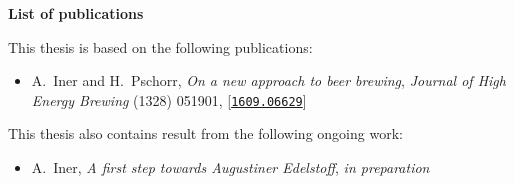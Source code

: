%
%
%
%


\pagestyle{empty}
\begin{center}
\Large \textbf{List of publications}
\end{center}

\noindent
This thesis is based on the following publications:
\begin{itemize}
% 
 \item \cite{Augstiner:1328aim} A.~Iner and H.~Pschorr, \emph{{On a new approach to beer brewing}},
  {\emph{Journal of High Energy Brewing} (1328) 051901},
  [\href{https://arxiv.org/abs/1609.06629}{\texttt{1609.06629}}]
\end{itemize}
This thesis also contains result from the following ongoing work:
\begin{itemize}
%
 \item \cite{Augstiner:Edelstoff} A.~Iner, \emph{{A first step towards Augustiner Edelstoff}}, {\emph{in
  preparation}}
\end{itemize}
